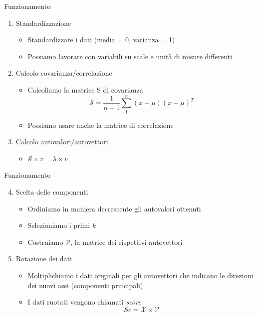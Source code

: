 \documentclass[xcolor={dvipsnames}]{beamer}
\begin{document}
		\begin{frame}{Funzionamento}
			\begin{enumerate}
				\item Standardizzazione
				\begin{itemize}
					\item Standardizzare i dati (media = 0, varianza = 1)
					\item Possiamo lavorare con variabili su scale e unità di misure differenti
				\end{itemize}
				\item Calcolo covarianza/correlazione
				\begin{itemize}
					\item Calcoliamo la matrice S di covarianza $$\mathcal{S} = \frac{1}{n-1} \sum_{1}^{n} (x-\mu)(x-\mu)^T$$
					\item Possiamo usare anche la matrice di correlazione
				\end{itemize}
				\item Calcolo autovalori/autovettori 
				\begin{itemize}
					\item $\mathcal{S} \times v = \lambda \times v$
				\end{itemize}
			\end{enumerate}
		\end{frame}

	\begin{frame}{Funzionamento}
		\begin{enumerate}
			\setcounter{enumi}{3}
			\item Scelta delle componenti
			\begin{itemize}
				\item Ordiniamo in maniera decrescente gli autovalori ottenuti
				\item Selezioniamo i primi \emph{k}
				\item Costruiamo $\mathcal{V}$, la matrice dei rispettivi autovettori
			\end{itemize}
			\item Rotazione dei dati
			\begin{itemize}
				\item Moltiplichiamo i dati originali per gli autovettori che indicano le direzioni dei nuovi assi (componenti principali) 
				\item I dati ruotati vengono chiamati \emph{score} $$Sc = \mathcal{X} \times \mathcal{V}$$
			\end{itemize}
		\end{enumerate}
	\end{frame}
\end{document}
